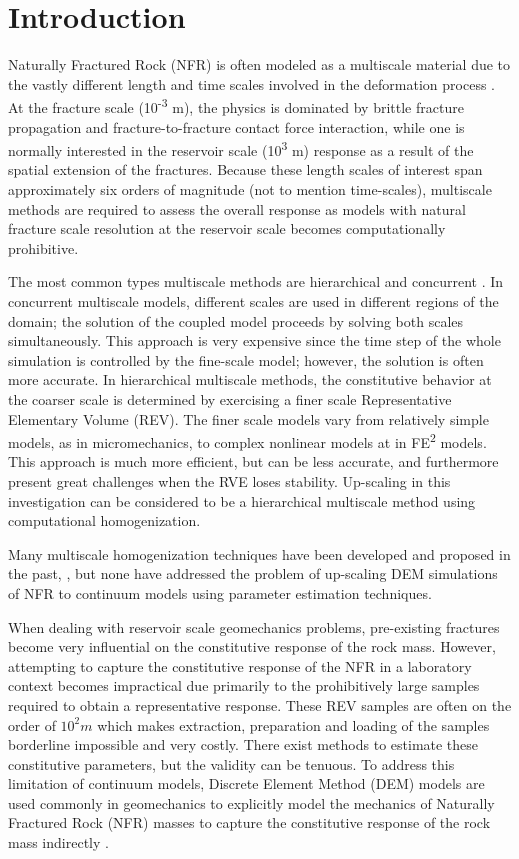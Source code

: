 \section{Introduction}
Naturally Fractured Rock (NFR) is often modeled as a multiscale material due to the vastly different length and time scales involved in the deformation process \citep{zhou_flow_2003}. At the fracture scale (10\textsuperscript{-3} m), the physics is dominated by brittle fracture propagation and fracture-to-fracture contact force interaction, while one is normally interested in the reservoir scale (10\textsuperscript{3} m) response as a result of the spatial extension of the fractures. Because these length scales of interest span approximately six orders of magnitude (not to mention time-scales), multiscale methods are required to assess the overall response as models with natural fracture scale resolution at the reservoir scale becomes computationally prohibitive.

The most common types multiscale methods are hierarchical and concurrent \citep{Gracie_2011}. In concurrent multiscale models, different scales are used in different regions of the domain; the solution of the coupled model proceeds by solving both scales simultaneously. This approach is very expensive since the time step of the whole simulation is controlled by the fine-scale model; however, the solution is often more accurate.  In hierarchical multiscale methods, the constitutive behavior at the coarser scale is determined by exercising a finer scale Representative Elementary Volume (REV). The finer scale models vary from relatively simple models, as in micromechanics, to complex nonlinear models at in FE\textsuperscript{2} models. This approach is much more efficient, but can be less accurate, and furthermore  present great challenges when the RVE loses stability. Up-scaling in this investigation can be considered to be a hierarchical multiscale method using computational homogenization. 

Many multiscale homogenization techniques have been developed and proposed in the past, \citep{Aanonsen_2006,Temizer_2009,Loehnert_2005}, but none have addressed the problem of up-scaling DEM simulations of NFR to continuum models using parameter estimation techniques.

When dealing with reservoir scale geomechanics problems, pre-existing fractures become very influential on the constitutive response of the rock mass. However, attempting to capture the constitutive response of the NFR in a laboratory context becomes impractical due primarily to the prohibitively large samples required to obtain a representative response. These REV samples are often on the order of $10^2m$ which makes extraction, preparation and loading of the samples borderline impossible and very costly. There exist methods to estimate these constitutive parameters, but the validity can be tenuous. To address this limitation of continuum models, Discrete Element Method (DEM) models are used commonly in geomechanics to explicitly model the mechanics of Naturally Fractured Rock (NFR) masses to capture the constitutive response of the rock mass indirectly \citep{jing_review_2003}. 

